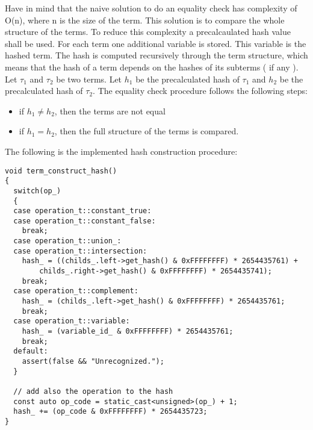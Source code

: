 \documentclass{article}
\begin{document}
		Have in mind that the naive solution to do an equality check has complexity of O(n), where n is the size of the term. This solution is to 
		compare the whole structure of the terms. To reduce this complexity a precalcaulated hash value shall be used.
		For each term one additional variable is stored. This variable is the hashed term. The hash is computed recursively through the term structure, which means 
		that the hash of a term depends on the hashes of its subterms ( if any ). 
		Let $\tau_1$ and $\tau_2$ be two terms. Let $h_1$ be the precalculated hash of $\tau_1$ and $h_2$ be the precalculated hash of $\tau_2$.
		The equality check procedure follows the following steps:
		\begin{itemize}
			\item if $h_1 \neq h_2$, then the terms are not equal
			\item if $h_1 = h_2$, then the full structure of the terms is compared.
		\end{itemize}
		\noindent
		The following is the implemented hash construction procedure:
	\begin{lstlisting}
void term_construct_hash()
{
  switch(op_)
  {
  case operation_t::constant_true:
  case operation_t::constant_false:
    break;
  case operation_t::union_:
  case operation_t::intersection:
    hash_ = ((childs_.left->get_hash() & 0xFFFFFFFF) * 2654435761) +
        childs_.right->get_hash() & 0xFFFFFFFF) * 2654435741);
    break;
  case operation_t::complement:
    hash_ = (childs_.left->get_hash() & 0xFFFFFFFF) * 2654435761;
    break;
  case operation_t::variable:
    hash_ = (variable_id_ & 0xFFFFFFFF) * 2654435761;
    break;
  default:
    assert(false && "Unrecognized.");
  }

  // add also the operation to the hash
  const auto op_code = static_cast<unsigned>(op_) + 1;
  hash_ += (op_code & 0xFFFFFFFF) * 2654435723;
}
	\end{lstlisting}
\end{document}
